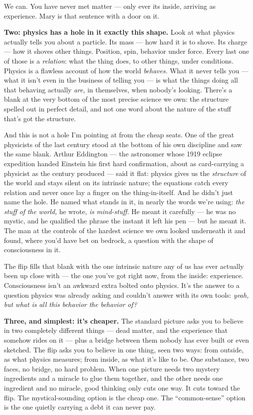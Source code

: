 \documentclass[11pt,openany]{book}
\begin{document}
We can. You have never met matter — only ever its inside, arriving as experience. Mary is that sentence with a door on it.

\textbf{Two: physics has a hole in it exactly this shape.} Look at what physics actually tells you about a particle. Its mass — how hard it is to shove. Its charge — how it shoves other things. Position, spin, behavior under force. Every last one of those is a \textit{relation}: what the thing does, to other things, under conditions. Physics is a flawless account of how the world \textit{behaves.} What it never tells you — what it isn’t even in the business of telling you — is what the things doing all that behaving actually \textit{are,} in themselves, when nobody’s looking. There’s a blank at the very bottom of the most precise science we own: the structure spelled out in perfect detail, and not one word about the nature of the stuff that’s got the structure.

And this is not a hole I’m pointing at from the cheap seats. One of the great physicists of the last century stood at the bottom of his own discipline and saw the same blank. Arthur Eddington — the astronomer whose 1919 eclipse expedition handed Einstein his first hard confirmation, about as card-carrying a physicist as the century produced — said it flat: physics gives us the \textit{structure} of the world and stays silent on its intrinsic nature; the equations catch every relation and never once lay a finger on the thing-in-itself. And he didn’t just name the hole. He named what stands in it, in nearly the words we’re using: \textit{the stuff of the world,} he wrote, \textit{is mind-stuff.} He meant it carefully — he was no mystic, and he qualified the phrase the instant it left his pen — but he meant it. The man at the controls of the hardest science we own looked underneath it and found, where you’d have bet on bedrock, a question with the shape of consciousness in it.

The flip fills that blank with the one intrinsic nature any of us has ever actually been up close with — the one you’ve got right now, from the inside: experience. Consciousness isn’t an awkward extra bolted onto physics. It’s the answer to a question physics was already asking and couldn’t answer with its own tools: \textit{yeah, but what is all this behavior the behavior of?}

\textbf{Three, and simplest: it’s cheaper.} The standard picture asks you to believe in two completely different things — dead matter, and the experience that somehow rides on it — plus a bridge between them nobody has ever built or even sketched. The flip asks you to believe in one thing, seen two ways: from outside, as what physics measures; from inside, as what it’s like to be. One substance, two faces, no bridge, no hard problem. When one picture needs two mystery ingredients and a miracle to glue them together, and the other needs one ingredient and no miracle, good thinking only cuts one way. It cuts toward the flip. The mystical-sounding option is the cheap one. The “common-sense” option is the one quietly carrying a debt it can never pay.
\end{document}
